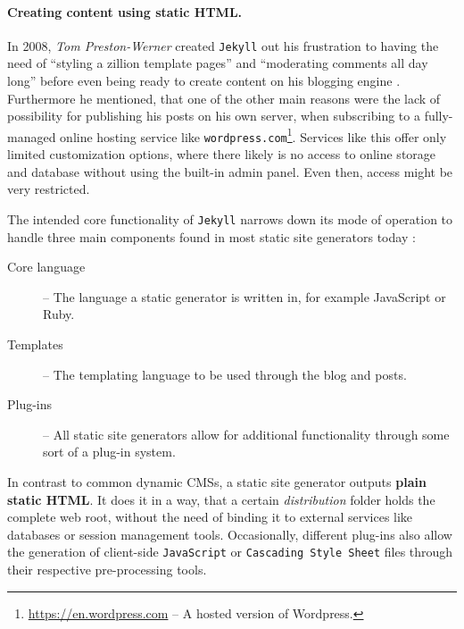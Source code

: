 \paragraph{Creating content using static HTML.}
\label{par:creatingcontent}
In 2008, \emph{Tom Preston-Werner} created \texttt{Jekyll} out his frustration to having the need of ``styling a zillion template pages'' and ``moderating comments all day long'' before even being ready to create content on his blogging engine \cite[]{PrestonWerner2008jekyll}. Furthermore he mentioned, that one of the other main reasons were the lack of possibility for publishing his posts on his own server, when subscribing to a fully-managed online hosting service like \texttt{wordpress.com}\footnote{\url{https://en.wordpress.com} -- A hosted version of Wordpress.}. Services like this offer only limited customization options, where there likely is no access to online storage and database without using the built-in admin panel. Even then, access might be very restricted.

The intended core functionality of \texttt{Jekyll} narrows down its mode of operation to handle three main components found in most static site generators today \cite[24]{dhillon2016}:

\begin{description}
  \item [Core language] -- The language a static generator is written in, for example JavaScript or Ruby.
  \item [Templates] -- The templating language to be used through the blog and posts.
  \item [Plug-ins] -- All static site generators allow for additional functionality through some
sort of a plug-in system.
\end{description}

In contrast to common dynamic CMSs, a static site generator outputs \textbf{plain static HTML}. It does it in a way, that a certain \emph{distribution} folder holds the complete web root, without the need of binding it to external services like databases or session management tools. Occasionally, different plug-ins also allow the generation of client-side \texttt{JavaScript} or \texttt{Cascading Style Sheet} files through their respective pre-processing tools.




